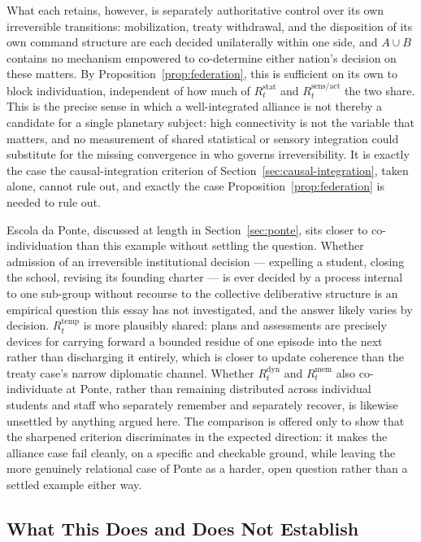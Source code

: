 \documentclass[11pt]{article}
\begin{document}
What each retains, however, is separately authoritative control over its own irreversible transitions: mobilization, treaty withdrawal, and the disposition of its own command structure are each decided unilaterally within one side, and $A\cup B$ contains no mechanism empowered to co-determine either nation's decision on these matters. By Proposition~\ref{prop:federation}, this is sufficient on its own to block individuation, independent of how much of $R^{\mathrm{stat}}_t$ and $R^{\mathrm{sens/act}}_t$ the two share. This is the precise sense in which a well-integrated alliance is not thereby a candidate for a single planetary subject: high connectivity is not the variable that matters, and no measurement of shared statistical or sensory integration could substitute for the missing convergence in who governs irreversibility. It is exactly the case the causal-integration criterion of Section~\ref{sec:causal-integration}, taken alone, cannot rule out, and exactly the case Proposition~\ref{prop:federation} is needed to rule out.

Escola da Ponte, discussed at length in Section~\ref{sec:ponte}, sits closer to co-individuation than this example without settling the question. Whether admission of an irreversible institutional decision --- expelling a student, closing the school, revising its founding charter --- is ever decided by a process internal to one sub-group without recourse to the collective deliberative structure is an empirical question this essay has not investigated, and the answer likely varies by decision. $R^{\mathrm{temp}}_t$ is more plausibly shared: plans and assessments are precisely devices for carrying forward a bounded residue of one episode into the next rather than discharging it entirely, which is closer to update coherence than the treaty case's narrow diplomatic channel. Whether $R^{\mathrm{dyn}}_t$ and $R^{\mathrm{mem}}_t$ also co-individuate at Ponte, rather than remaining distributed across individual students and staff who separately remember and separately recover, is likewise unsettled by anything argued here. The comparison is offered only to show that the sharpened criterion discriminates in the expected direction: it makes the alliance case fail cleanly, on a specific and checkable ground, while leaving the more genuinely relational case of Ponte as a harder, open question rather than a settled example either way.

\subsection{What This Does and Does Not Establish}
\label{sec:individuation-establishes}
\end{document}
